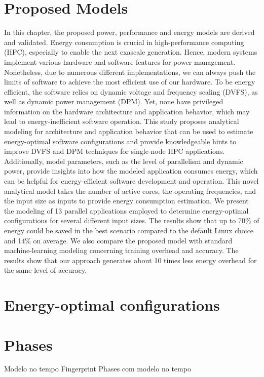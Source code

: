 \documentclass[
papersize=a4,
pagelayout=default,
fontname=latinmodern,
fontsize=11pt,
twoside,
final,
faculty=fpms,
]{umons-Thesis}
\begin{document}
	\chapter{Proposed Models} \label{chapter:models}
	In this chapter, the proposed power, performance and energy models are derived and validated.
	Energy consumption is crucial in high-performance computing (HPC), especially to enable the next exascale generation. Hence, modern systems implement various hardware and software features for power management. Nonetheless, due to numerous different implementations, we can always push the limits of software to achieve the most efficient use of our hardware. To be
	energy efficient, the software relies on dynamic voltage and frequency scaling (DVFS), as well as dynamic power management (DPM). Yet, none have privileged information on the hardware architecture and application behavior, which may lead to energy-inefficient software operation. 
	This study  proposes analytical modeling for architecture and application behavior that can be used to estimate energy-optimal software configurations and provide knowledgeable hints to improve DVFS and DPM techniques for single-node HPC applications.
	Additionally, model parameters, such as the level of parallelism and dynamic power, provide insights into how the modeled application consumes energy, which can be helpful for energy-efficient software development and operation.
	This novel analytical model takes the number of active cores, the operating frequencies, and the input size as inputs to provide energy consumption estimation.
	We present the modeling of 13 parallel applications employed to determine energy-optimal configurations for several different input sizes.
	The results show that up to 70\% of energy could be saved in the best scenario compared to the default Linux choice and 14\% on average.
	We also compare the proposed model with standard machine-learning modeling concerning training overhead and accuracy. The results show that our approach generates about 10 times less energy overhead for the same level of accuracy.
	
	
	\chapter{Energy-optimal configurations}
	
	
	\chapter{Phases}
	Modelo no tempo
	Fingerprint
	Phases com modelo no tempo
	
	
\end{document}
